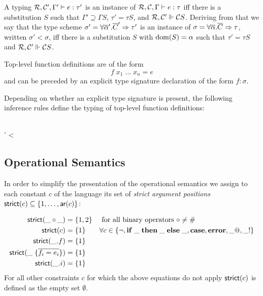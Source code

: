 A typing ${\mathcal R}, {\mathcal C}', \Gamma' \vdash e : \tau'$ is an instance of
${\mathcal R}, {\mathcal C}, \Gamma \vdash e : \tau$ iff there is a substitution $S$
such that $ \Gamma'\supseteq \Gamma S$, $\tau' = \tau S$, and
${\mathcal R}, {\mathcal C}' \Vdash {\mathcal C} S$. Deriving from that we say that the type
scheme $\sigma' = \forall \overline{\alpha}'. \overline{C}' \Rightarrow \tau'$ is an
instance of $\sigma = \forall \overline{\alpha}. \overline{C} \Rightarrow \tau$,
written $\sigma' < \sigma$, iff there is a substitution $S$ with
$\operatorname{dom}(S) = \alpha$ such that $\tau' = \tau S$ and
${\mathcal R}, {\mathcal C}' \Vdash {\mathcal C} S$.

Top-level function definitions are of the form
\[
f \; x_1 \; \dots \; x_n = e
\]
and can be preceded by an explicit type signature declaration of the
form $f : \sigma$.

Depending on whether an explicit type signature is present, the
following inference rules define the typing of top-level function definitions:
\begin{center}
  {\reptype{}}%
  {\tup\alpha \not\in \fv{\calC}\cup \fv{\Gamma}}%
  {\reptype{}}%
  \\[1em]
  {\reptype{}}%
  {\sigma' < \sigma}%
  {\reptype{}}%
\end{center}

\subsection{Operational Semantics}
\label{sec:oper-semant}

In order to simplify the presentation of the operational semantics we
assign to each constant $c$ of the language its set of \emph{strict
  argument positions} $\mathsf{strict}(c) \subseteq \left\{1,\dots,\mathsf{ar}(c)\right\}$:

\begin{align*}
  \mathsf{strict}(\_\circ\_) &= \left\{1,2\right\} && \text{ for all binary
    operators } \circ \neq \mathop{\#} \\
  \mathsf{strict}(c) &= \left\{1\right\} && \forall c \in \left\{\lnot,
    \mathbf{if}\;\_\;\mathbf{then}\;\_\;\mathbf{else}\;\_,\mathbf{case},\mathbf{error}, \_@,\_!\right\}\\
  \mathsf{strict}(\_. f) &= \left\{1\right\}\\
  \mathsf{strict}(\_\;\{\overline{f_i = e_i}\}) &= \left\{1\right\}\\
  \mathsf{strict}(\_.i) &= \left\{1\right\}
\end{align*}
For all other constraints $c$ for which the above equations do not
apply $\mathsf{strict}(c)$ is defined as the empty set $\emptyset$.

